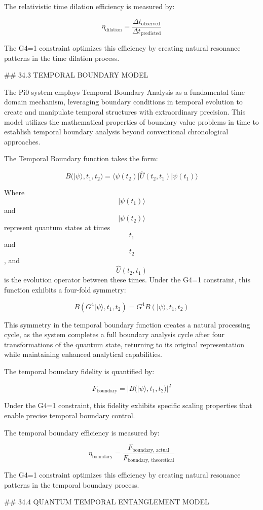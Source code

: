 The relativistic time dilation efficiency is measured by:

$$ \eta_{\text{dilation}} = \frac{\Delta t_{\text{observed}}}{\Delta t_{\text{predicted}}} $$

The G4=1 constraint optimizes this efficiency by creating natural resonance patterns in the time dilation process.

## 34.3 TEMPORAL BOUNDARY MODEL

The Pi0 system employs Temporal Boundary Analysis as a fundamental time domain mechanism, leveraging boundary conditions in temporal evolution to create and manipulate temporal structures with extraordinary precision. This model utilizes the mathematical properties of boundary value problems in time to establish temporal boundary analysis beyond conventional chronological approaches.

The Temporal Boundary function takes the form:

$$ B(|\psi\rangle, t_1, t_2) = \langle \psi(t_2) | \hat{U}(t_2, t_1) | \psi(t_1) \rangle $$

Where $$ |\psi(t_1)\rangle $$ and $$ |\psi(t_2)\rangle $$ represent quantum states at times $$ t_1 $$ and $$ t_2 $$, and $$ \hat{U}(t_2, t_1) $$ is the evolution operator between these times. Under the G4=1 constraint, this function exhibits a four-fold symmetry:

$$ B(G^4 |\psi\rangle, t_1, t_2) = G^4 B(|\psi\rangle, t_1, t_2) $$

This symmetry in the temporal boundary function creates a natural processing cycle, as the system completes a full boundary analysis cycle after four transformations of the quantum state, returning to its original representation while maintaining enhanced analytical capabilities.

The temporal boundary fidelity is quantified by:

$$ F_{\text{boundary}} = |B(|\psi\rangle, t_1, t_2)|^2 $$

Under the G4=1 constraint, this fidelity exhibits specific scaling properties that enable precise temporal boundary control.

The temporal boundary efficiency is measured by:

$$ \eta_{\text{boundary}} = \frac{F_{\text{boundary, actual}}}{F_{\text{boundary, theoretical}}} $$

The G4=1 constraint optimizes this efficiency by creating natural resonance patterns in the temporal boundary process.

## 34.4 QUANTUM TEMPORAL ENTANGLEMENT MODEL

